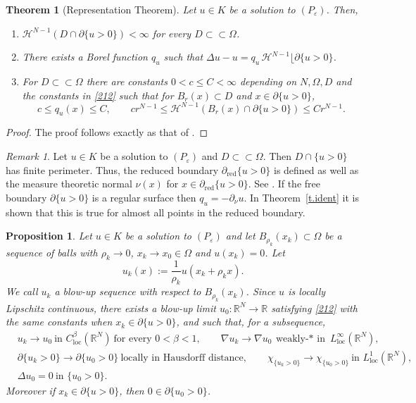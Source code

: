 \documentclass[11pt]{amsart}
\newtheorem{theorem}{Theorem}[section]
\newtheorem{proposition}{Proposition}[section]
\theoremstyle{definition}
\theoremstyle{remark}
\newtheorem{remark}{Remark}[section]
\numberwithin{equation}{section}
\newcommand{\R}{\mathbb{R}}
\newcommand{\cH}{\mathcal{H}}
\newcommand{\red}{\mathrm{red}}
\begin{document}
\begin{theorem}[Representation Theorem]\label{t.repr}
Let $u\in K$ be a solution to $(P_\varepsilon)$. Then,
\begin{enumerate}
\item $\cH^{N-1}(D\cap\partial\{u>0\})<\infty$ for every $D\subset\subset\Omega$.
\item There exists a Borel function $q_u$ such that $\Delta u-u=q_u\,\cH^{N-1}\lfloor\partial\{u>0\}$.
\item For $D\subset\subset\Omega$ there are constants $0<c\le C<\infty$ depending on $N,\Omega,D$ and the constants in \eqref{212} such that for $B_r(x)\subset D$ and $x\in\partial\{u>0\}$,
\[
c\le q_u(x)\le C,\qquad cr^{N-1}\le\cH^{N-1}(B_r(x)\cap\partial\{u>0\})\le Cr^{N-1}.
\]
\end{enumerate}
\end{theorem}

\begin{proof}
The proof follows exactly as that of \cite[Theorem~4.5]{AC}.
\end{proof}

\begin{remark}\label{r.red}
Let $u\in K$ be a solution to $(P_\varepsilon)$ and $D\subset\subset\Omega$. Then $D\cap\{u>0\}$ has finite perimeter. Thus, the reduced boundary $\partial_\red\{u>0\}$ is defined as well as the measure theoretic normal $\nu(x)$ for $x\in\partial_\red\{u>0\}$. See \cite{Fe}. If the free boundary $\partial\{u>0\}$ is a regular surface then $q_u=-\partial_\nu u$. In Theorem~\ref{t.ident} it is shown that this is true for almost all points in the reduced boundary.
\end{remark}

\begin{proposition}\label{p.blowup}
Let $u\in K$ be a solution to $(P_\varepsilon)$ and let $B_{\rho_k}(x_k)\subset\Omega$ be a sequence of balls with $\rho_k\to0$, $x_k\to x_0\in\Omega$ and $u(x_k)=0$. Let
\[
u_k(x):=\frac1{\rho_k}u(x_k+\rho_kx).
\]
We call $u_k$ a blow-up sequence with respect to $B_{\rho_k}(x_k)$. Since $u$ is locally Lipschitz continuous, there exists a blow-up limit $u_0:\R^N\to\R$ satisfying \eqref{212} with the same constants when $x_k\in\partial\{u>0\}$, and such that, for a subsequence,
\[
\begin{aligned}
&u_k\to u_0\ \text{in } C^\beta_{\mathrm{loc}}(\R^N)\ \text{for every } 0<\beta<1,\qquad
\nabla u_k\to\nabla u_0\ \text{weakly-$*$ in } L^\infty_{\mathrm{loc}}(\R^N),\\
&\partial\{u_k>0\}\to\partial\{u_0>0\}\ \text{locally in Hausdorff distance},\qquad
\chi_{\{u_k>0\}}\to\chi_{\{u_0>0\}}\ \text{in } L^1_{\mathrm{loc}}(\R^N),\\
&\Delta u_0=0\ \text{in }\{u_0>0\}.
\end{aligned}
\]
Moreover if $x_k\in\partial\{u>0\}$, then $0\in\partial\{u_0>0\}$.
\end{proposition}
\end{document}
